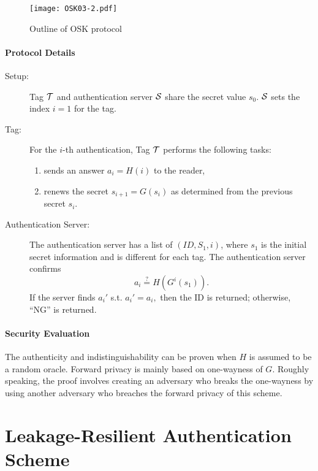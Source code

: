 \documentclass[english]{llncs}
\begin{document}
\begin{figure}[htb]
\begin{center}
\texttt{[image: OSK03-2.pdf]}
\caption{Outline of OSK protocol}
\label{fig:OSK03}
\end{center}
\end{figure}


\paragraph{Protocol Details}
\begin{description}
\item [{Setup:}] Tag ${\cal T}$ and authentication server ${\cal S}$
share the secret value $s_{0}$. ${\cal S}$ sets the index $i=1$
for the tag.
\item [{Tag:}] For the $i$-th authentication, Tag ${\cal T}$ performs
the following tasks:

\begin{enumerate}
\item sends an answer $a_{i}=H(i)$ to the reader, 
\item renews the secret $s_{i+1}=G(s_{i})$ as determined from the previous
secret $s_{i}$. 
\end{enumerate}
\item [{Authentication Server:}] The authentication server has a list of
$(ID,S_{1},i)$, where $s_{1}$ is the initial secret information
and is different for each tag. The authentication server confirms
\[
a_{i}\stackrel{?}{=}H(G^{i}(s_{1})).\]
 If the server finds $a_{i}'$ s.t. $a_{i}'=a_{i},$ then the ID is
returned; otherwise, {}``NG'' is returned. 
\end{description}

\paragraph{Security Evaluation}

The authenticity and indistinguishability can be proven when $H$
is assumed to be a random oracle. Forward privacy is mainly based
on one-wayness of $G$. Roughly speaking, the proof involves creating
an adversary who breaks the one-wayness by using another adversary
who breaches the forward privacy of this scheme.


\section{Leakage-Resilient Authentication Scheme}
\end{document}
